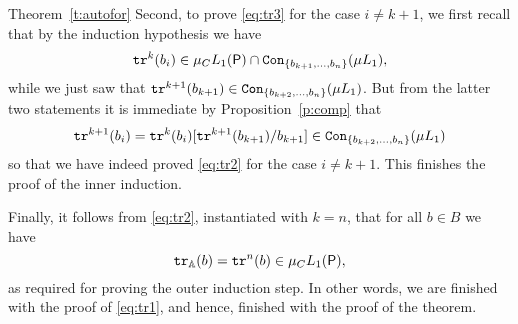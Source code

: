 \begin{proofof}{Theorem~\ref{t:autofor}}
Second, to prove \eqref{eq:tr3} for the case $i \neq k+1$, we first 
recall that by the induction hypothesis we have
\[
\mathtt{tr}^{k}(b_{i}) \in \mu_{C}L_{1}(\mathsf{P}) \cap 
    \mathtt{Con}_{\{ b_{k+1},\ldots,b_{n}\}}(\mu L_{1}),
\]
while we just saw that 
$\mathtt{tr}^{k+1}(b_{k+1}) \in \mathtt{Con}_{\{ b_{k+2},\ldots,b_{n}\}}(\mu L_{1})$.
But from the latter two statements it is immediate by Proposition~\ref{p:comp} 
that 
\[
\mathtt{tr}^{k+1}(b_{i}) = \mathtt{tr}^{k}(b_{i})[\mathtt{tr}^{k+1}(b_{k+1})/b_{k+1}] 
\in \mathtt{Con}_{\{ b_{k+2},\ldots,b_{n}\}}(\mu L_{1})
\]
so that we have indeed proved \eqref{eq:tr2} for the case $i \neq 
k+1$.
This finishes the proof of the inner induction.

Finally, it follows from \eqref{eq:tr2}, instantiated with $k = n$, 
that for all $b \in B$ we have
\[
\mathtt{tr}_{\mathbb{A}}(b) = \mathtt{tr}^{n}(b) \in \mu_{C}L_{1}(\mathsf{P}),
\]
as required for proving the outer induction step.
In other words, we are finished with the proof of \eqref{eq:tr1}, and 
hence, finished with the proof of the theorem.
\end{proofof}


